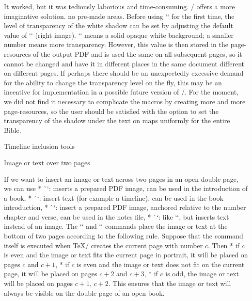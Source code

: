 {{{{It worked, but it was tediously laborious and time-consuming.
\OpBible/ offers a more imaginative solution. 
no pre-made areas. Before using `\putstext` for the first time, the level of transparency of the white shadow can be set by adjusting the default value of `\def\shadowparameter{.1}`
(right image). `\def\shadowparameter{1}` means a solid opaque white background; a smaller number means more transparency.
However, this value is then stored in the page-resources of the output PDF and is used the same on all subsequent pages, so it cannot be changed and have it in different places in the same document
different on different pages. If perhaps there should be an unexpectedly excessive demand for the ability to change the transparency level on the fly, this may be an incentive for implementation in a possible future version of \OpBible/.
For the moment, we did not find it necessary to complicate the macros by creating more and more page-resources, so the user should be satisfied with the option to set the transparency of the shadow under the text
on maps uniformly for the entire Bible.  




\sec Timeline inclusion tools

\secc[spanimage] Image or text over two pages

If we want to insert an image or text across two pages in an open double page, we can
use
\begitems
* \`\insertSpanImage`: inserts a prepared PDF image, can be used in the introduction of a book,
* \`\insertSpanText`: insert text (for example a timeline), can be used in the book introduction,
* \`\putSpanImage`: insert a prepared PDF image, anchored relative to the number
   chapter and verse, can be used in the notes file,
* \`\putSpanText`: like `\putSpanImage`, but inserts text instead of an image.
\enditems
The `\insertSpanImage` and `\insertSpanText` commands place the image or text 
at the bottom of two pages according to the following rule. Suppose that
the command itself is executed when \TeX/ creates the current page with
number $c$. Then
\begitems
* if $c$ is even and the image or text fits the current page in portrait,
  it will be placed on pages $c$ and $c+1$,
* if $c$ is even and the image or text does not fit on the current page,
  it will be placed on pages $c+2$ and $c+3$,
* if $c$ is odd, the image or text will be placed on pages $c+1$, $c+2$.
\enditems
This ensures that the image or text will always be visible on the double page
of an open book.

}}}}
